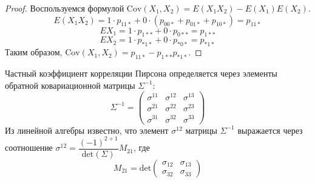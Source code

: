 \documentclass{article}
\theoremstyle{definition}
\newtheorem{theorem}{Теорема}[section]
\begin{document}
\begin{proof}
    Воспользуемся формулой $\text{Cov}(X_1,X_2)=E(X_1 X_2)-E(X_1)E(X_2)$.
    $$E(X_1 X_2) = 1 \cdot p_{11*} + 0 \cdot (p_{00*} + p_{01*} + p_{10*})=p_{11*}$$
    $$EX_1 = 1 \cdot p_{1**} + 0 \cdot p_{0**}=p_{1**}$$
    $$ EX_2 = 1 \cdot p_{*1*} + 0 \cdot p_{*0*} = p_{*1*}$$
    Таким образом, $\text{Cov}(X_1,X_2)=p_{11*}-p_{1**}p_{*1*}$.
\end{proof}



Частный коэффициент корреляции Пирсона определяется через элементы обратной ковариационной матрицы $\Sigma^{-1}$:
$$
    \Sigma^{-1}=\begin{pmatrix}
        \sigma^{11} & \sigma^{12} & \sigma^{13} \\
        \sigma^{21} & \sigma^{22} & \sigma^{23} \\
        \sigma^{31} & \sigma^{32} & \sigma^{33}
    \end{pmatrix}
$$
Из линейной алгебры известно, что элемент $\sigma^{12}$ матрицы $\Sigma^{-1}$ выражается через соотношение
$\sigma^{12}=\dfrac{(-1)^{2+1}}{\text{det} (\Sigma)}M_{21}$, где
$$
    M_{21}=\text{det}
    \begin{pmatrix}
        \sigma_{12} & \sigma_{13} \\
        \sigma_{32} & \sigma_{33}
    \end{pmatrix}
$$
\end{document}
